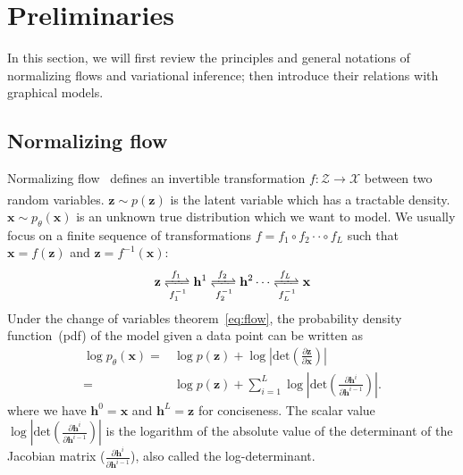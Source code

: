 \documentclass[conference]{IEEEtran}
\begin{document}
\section{Preliminaries}
In this section, we will first review the principles and general notations of normalizing flows and variational inference; then introduce their relations with graphical models.
\subsection{Normalizing flow}
Normalizing flow~\cite{kingma2018glow,rezende2015variational} defines an invertible transformation $f: \mathcal{Z} \xrightarrow[]{} \mathcal{X}$ between two random variables. $\mathbf{z} \sim p(\mathbf{z})$ is the latent variable which has a tractable density. $\mathbf{x} \sim p_\theta(\mathbf{x})$ is an unknown true distribution which we want to model. We usually focus on a finite sequence of transformations $f=f_1  \circ f_2   \cdot \cdot     \circ   f_L$ such that $\mathbf{x}=f(\mathbf{z})$ and $\mathbf{z}=f^{-1}(\mathbf{x})$:
\begin{align}
    \mathbf{z} \xrightleftharpoons[f_1^{-1}]{f_1} \mathbf{h}^1 \xrightleftharpoons[f_2^{-1}]{f_2} \mathbf{h}^2 \cdots \xrightleftharpoons[f_L^{-1}]{f_L}\mathbf{x}
\end{align}
Under the change of variables theorem~\eqref{eq:flow}, the probability density function~(pdf) of the model given a data point can be written as 
\begin{align}\label{eq:flow}
\log p_\theta(\mathbf{x}) =& \log p(\mathbf{z})  + \log | \text{det} ( \frac{\partial \mathbf{z} }{\partial \mathbf{x}} ) | \\
= & \log p(\mathbf{z}) + \sum_{i=1}^L\log | \text{det} ( \frac{\partial \mathbf{h}^i } {\partial \mathbf{h}^{i-1}}) | .
\end{align}
where we have $\mathbf{h}^0 = \mathbf{x}$ and $\mathbf{h}^L = \mathbf{z}$ for conciseness. The scalar value $\log |\text{det}( \frac{\partial \mathbf{h}^i}{\partial \mathbf{h}^{i-1}})|$ is the logarithm of the absolute value of the determinant of the Jacobian matrix ($\frac{\partial \mathbf{h}^i}{ \partial\mathbf{h}^{i-1}}$), also called the log-determinant. 
\end{document}
